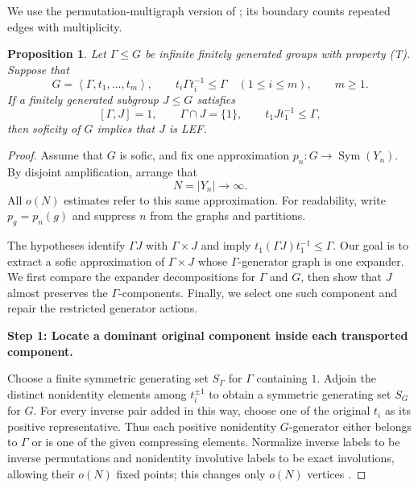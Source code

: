 \documentclass[10pt]{article}
\newtheorem{proposition}[theorem]{Proposition}
\newcommand{\Sym}{\operatorname{Sym}}
\newcommand{\stephead}[1]{\par\medskip\noindent\textbf{#1}\par\smallskip}
\newcommand{\abs}[1]{\left|#1\right|}
\newcommand{\angles}[1]{\left\langle #1\right\rangle}
\begin{document}
We use the permutation-multigraph version of \cite[Theorem~1.1 and Section~4]{KT19}; its boundary counts repeated edges with multiplicity.

\begin{proposition}
Let $\Gamma\leq G$ be infinite finitely generated groups with property (T)\@. Suppose that
\[
G=\angles{\Gamma,t_1,\ldots,t_m},\qquad t_i\Gamma t_i^{-1}\leq\Gamma\quad(1\leq i\leq m),\qquad m\geq1.
\]
If a finitely generated subgroup $J\leq G$ satisfies
\[
[\Gamma,J]=1,\qquad \Gamma\cap J=\{1\},\qquad t_1Jt_1^{-1}\leq\Gamma,
\]
then soficity of $G$ implies that $J$ is LEF.
\end{proposition}

\begin{proof}
Assume that $G$ is sofic, and fix one approximation $p_n:G\to\Sym(Y_n)$. By disjoint amplification, arrange that
\[
N=\abs{Y_n}\longrightarrow\infty.
\]
All $o(N)$ estimates refer to this same approximation. For readability, write $p_g=p_n(g)$ and suppress $n$ from the graphs and partitions.

The hypotheses identify $\Gamma J$ with $\Gamma\times J$ and imply $t_1(\Gamma J)t_1^{-1}\leq\Gamma$. Our goal is to extract a sofic approximation of $\Gamma\times J$ whose $\Gamma$-generator graph is one expander. We first compare the expander decompositions for $\Gamma$ and $G$, then show that $J$ almost preserves the $\Gamma$-components. Finally, we select one such component and repair the restricted generator actions.

\stephead{Step 1: Locate a dominant original component inside each transported component.}
Choose a finite symmetric generating set $S_\Gamma$ for $\Gamma$ containing $1$. Adjoin the distinct nonidentity elements among $t_i^{\pm1}$ to obtain a symmetric generating set $S_G$ for $G$. For every inverse pair added in this way, choose one of the original $t_i$ as its positive representative. Thus each positive nonidentity $G$-generator either belongs to $\Gamma$ or is one of the given compressing elements. Normalize inverse labels to be inverse permutations and nonidentity involutive labels to be exact involutions, allowing their $o(N)$ fixed points; this changes only $o(N)$ vertices \cite[Lemma~2.1]{ES06}.


\end{proof}
\end{document}

